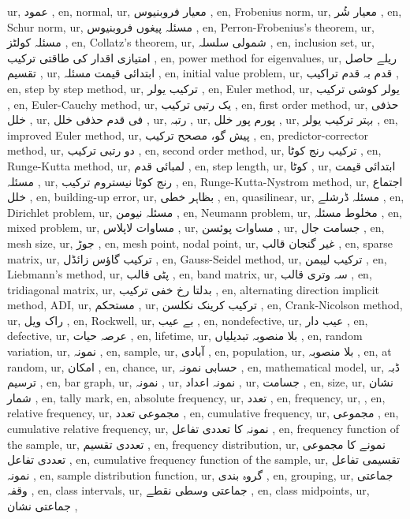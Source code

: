 ur, عمود ,
en, normal,
ur, معیار فروبنیوس ,
en, Frobenius norm,
ur, معیار شُر ,
en, Schur norm,
ur, مسئلہ پیغوں فروبنیوس ,
en, Perron-Frobenius's theorem,
ur, مسئلہ کولٹز ,
en, Collatz's theorem,
ur, شمولی سلسلہ ,
en, inclusion set,
ur, امتیازی اقدار کی طاقتی ترکیب ,
en, power method for eigenvalues,
ur, ریلے حاصل تقسیم ,
ur, ابتدائی قیمت مسئلہ ,
en, initial value problem,
ur, قدم بہ قدم تراکیب ,
en, step by step method,
ur, ترکیب یولر ,
en, Euler method,
ur, یولر کوشی ترکیب ,
en, Euler-Cauchy method,
ur, یک رتبی ترکیب ,
en, first order method,
ur, حذفی خلل ,
ur, فی قدم حذفی خلل ,
ur, رتبہ ,
ur, پورم پور خلل ,
ur, بہتر ترکیب یولر ,
en, improved Euler method,
ur, پیش گو، مصحح ترکیب ,
en, predictor-corrector method,
ur, دو رتبی ترکیب ,
en, second order method,
ur, ترکیب رنج کوٹا ,
en, Runge-Kutta method,
ur, لمبائی قدم ,
en, step length,
ur, کوٹا ,
ur, ابتدائی قیمت مسئلہ ,
ur, رنج کوٹا نیستروم ترکیب ,
en, Runge-Kutta-Nystrom method,
ur, اجتماع خلل ,
en, building-up error,
ur, بظاہر خطی ,
en, quasilinear,
ur, مسئلہ ڈرشلے ,
en, Dirichlet problem,
ur, مسئلہ نیومن ,
en, Neumann problem,
ur, مخلوط مسئلہ ,
en, mixed problem,
ur, مساوات لاپلاس ,
ur, مساوات پوئسن ,
ur, جسامت جال ,
en, mesh size,
ur, جوڑ ,
en, mesh point, nodal point,
ur, غیر گنجان قالب ,
en, sparse matrix,
ur, ترکیب گاؤس زائڈل ,
en, Gauss-Seidel method,
ur, ترکیب لیبمن ,
en, Liebmann's method,
ur, پٹی قالب ,
en, band matrix,
ur, سہ وتری قالب ,
en, tridiagonal matrix,
ur, بدلتا رخ خفی ترکیب ,
en, alternating direction implicit method, ADI,
ur, مستحکم ,
ur, ترکیب کرینک نکلسن ,
en, Crank-Nicolson method,
ur, راک ویل ,
en, Rockwell,
ur, بے عیب ,
en, nondefective,
ur, عیب دار ,
en, defective,
ur, عرصہ حیات ,
en, lifetime,
ur, بلا منصوبہ تبدیلیاں ,
en, random variation,
ur, نمونہ ,
en, sample,
ur, آبادی ,
en, population,
ur, بلا منصوبہ ,
en, at random,
ur, امکان ,
en, chance,
ur, حسابی نمونہ ,
en, mathematical model,
ur, ڈبہ ترسیم ,
en, bar graph,
ur, نمونہ ,
ur, نمونہ اعداد ,
ur, جسامت ,
en, size,
ur, نشان شمار ,
en, tally mark,
en, absolute frequency,
ur, تعدد ,
en, frequency,
ur,  ,
en, relative frequency,
ur, مجموعی تعدد ,
en, cumulative frequency,
ur, مجموعی  ,
en, cumulative relative frequency,
ur, نمونہ کا تعددی تفاعل ,
en, frequency function of the sample,
ur, تعددی تقسیم ,
en, frequency distribution,
ur, نمونے کا مجموعی تعددی تفاعل ,
en, cumulative frequency function of the sample,
ur, تقسیمی تفاعل نمونہ ,
en, sample distribution function,
ur, گروہ بندی ,
en, grouping,
ur, جماعتی وقفہ ,
en, class intervals,
ur, جماعتی وسطی نقطے ,
en, class midpoints,
ur, جماعتی نشان ,

